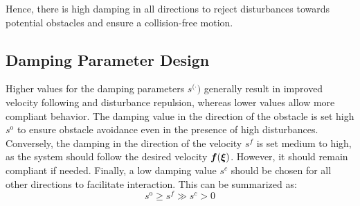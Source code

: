 Hence, there is high damping in all directions to reject disturbances towards potential obstacles and ensure a collision-free motion.

\subsection{Damping Parameter Design}
Higher values for the damping parameters $s^{(\cdot})$ generally result in improved velocity following and disturbance repulsion, whereas lower values allow more compliant behavior.
The damping value in the direction of the obstacle is set high $s^{\mathrm{o}}$ to ensure obstacle avoidance even in the presence of high disturbances. 
Conversely, the damping in the direction of the velocity $s^{f}$ is set medium to high, as the system should follow the desired velocity $\boldsymbol{f}(\boldsymbol{\xi})$. However, it should remain compliant if needed.
Finally, a low damping value $s^{c}$ should be chosen for all other directions to facilitate interaction.
This can be summarized as:
\begin{equation}
s^{\mathrm{o}} \geq s^{f} \gg s^{c} > 0
\end{equation}
